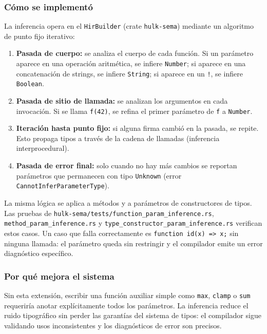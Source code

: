\documentclass[12pt,letterpaper]{article}
\newcommand{\src}[1]{\texttt{#1}}
\begin{document}
\subsubsection{Cómo se implementó}

La inferencia opera en el \src{HirBuilder} (crate \src{hulk-sema}) mediante un algoritmo de punto fijo iterativo:

\begin{enumerate}[label=\arabic*.]
    \item \textbf{Pasada de cuerpo:} se analiza el cuerpo de cada función. Si un parámetro aparece en una operación aritmética, se infiere \src{Number}; si aparece en una concatenación de strings, se infiere \src{String}; si aparece en un \src{!}, se infiere \src{Boolean}.
    \item \textbf{Pasada de sitio de llamada:} se analizan los argumentos en cada invocación. Si se llama \src{f(42)}, se refina el primer parámetro de \src{f} a \src{Number}.
    \item \textbf{Iteración hasta punto fijo:} si alguna firma cambió en la pasada, se repite. Esto propaga tipos a través de la cadena de llamadas (inferencia interprocedural).
    \item \textbf{Pasada de error final:} solo cuando no hay más cambios se reportan parámetros que permanecen con tipo \src{Unknown} (error \src{CannotInferParameterType}).
\end{enumerate}

La misma lógica se aplica a métodos y a parámetros de constructores de tipos. Las pruebas de \src{hulk-sema/tests/function\_param\_inference.rs}, \src{method\_param\_inference.rs} y \src{type\_constructor\_param\_inference.rs} verifican estos casos. Un caso que falla correctamente es \src{function id(x) => x;} sin ninguna llamada: el parámetro queda sin restringir y el compilador emite un error diagnóstico específico.

\subsubsection{Por qué mejora el sistema}

Sin esta extensión, escribir una función auxiliar simple como \src{max}, \src{clamp} o \src{sum} requeriría anotar explícitamente todos los parámetros. La inferencia reduce el ruido tipográfico sin perder las garantías del sistema de tipos: el compilador sigue validando usos inconsistentes y los diagnósticos de error son precisos.
\end{document}
